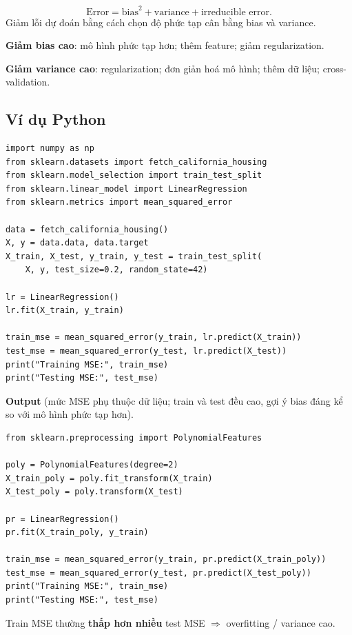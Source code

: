 \begin{ynghia}[title={Biểu thức toán học}]
\[
\text{Error} = \text{bias}^2 + \text{variance} + \text{irreducible error}.
\]
Giảm lỗi dự đoán bằng cách chọn độ phức tạp cân bằng bias và variance.
\end{ynghia}

\begin{phuongphap}[title={Kỹ thuật cân bằng}]
\textbf{Giảm bias cao}: mô hình phức tạp hơn; thêm feature; giảm regularization.

\textbf{Giảm variance cao}: regularization; đơn giản hoá mô hình; thêm dữ liệu; cross-validation.
\end{phuongphap}

\subsection{Ví dụ Python}

\begin{vidu}[title={High bias --- Linear Regression}]
\begin{lstlisting}
import numpy as np
from sklearn.datasets import fetch_california_housing
from sklearn.model_selection import train_test_split
from sklearn.linear_model import LinearRegression
from sklearn.metrics import mean_squared_error

data = fetch_california_housing()
X, y = data.data, data.target
X_train, X_test, y_train, y_test = train_test_split(
    X, y, test_size=0.2, random_state=42)

lr = LinearRegression()
lr.fit(X_train, y_train)

train_mse = mean_squared_error(y_train, lr.predict(X_train))
test_mse = mean_squared_error(y_test, lr.predict(X_test))
print("Training MSE:", train_mse)
print("Testing MSE:", test_mse)
\end{lstlisting}

\textbf{Output} (mức MSE phụ thuộc dữ liệu; train và test đều cao, gợi ý bias đáng kể so với mô hình phức tạp hơn).
\end{vidu}

\begin{vidu}[title={Low bias, high variance --- Polynomial Regression}]
\begin{lstlisting}
from sklearn.preprocessing import PolynomialFeatures

poly = PolynomialFeatures(degree=2)
X_train_poly = poly.fit_transform(X_train)
X_test_poly = poly.transform(X_test)

pr = LinearRegression()
pr.fit(X_train_poly, y_train)

train_mse = mean_squared_error(y_train, pr.predict(X_train_poly))
test_mse = mean_squared_error(y_test, pr.predict(X_test_poly))
print("Training MSE:", train_mse)
print("Testing MSE:", test_mse)
\end{lstlisting}

Train MSE thường \textbf{thấp hơn nhiều} test MSE $\Rightarrow$ overfitting / variance cao.
\end{vidu}

